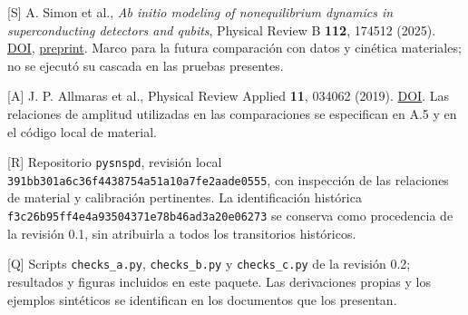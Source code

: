 \documentclass[
  spanish,
  10pt,
  a4paper,
]{article}
\newcounter{none} %
\begin{document}
{[}S{]} A. Simon et al., \emph{Ab initio modeling of nonequilibrium
dynamics in superconducting detectors and qubits}, Physical Review B
\textbf{112}, 174512 (2025).
\href{https://doi.org/10.1103/3m2k-mzr6}{DOI},
\href{https://arxiv.org/abs/2501.13791}{preprint}. Marco para la futura
comparación con datos y cinética materiales; no se ejecutó su cascada en
las pruebas presentes.

{[}A{]} J. P. Allmaras et al., Physical Review Applied \textbf{11},
034062 (2019).
\href{https://doi.org/10.1103/PhysRevApplied.11.034062}{DOI}. Las
relaciones de amplitud utilizadas en las comparaciones se especifican en
A.5 y en el código local de material.

{[}R{]} Repositorio \nolinkurl{pysnspd}, revisión local
\nolinkurl{391bb301a6c36f4438754a51a10a7fe2aade0555}, con inspección de las
relaciones de material y calibración pertinentes. La identificación
histórica \nolinkurl{f3c26b95ff4e4a93504371e78b46ad3a20e06273} se conserva
como procedencia de la revisión 0.1, sin atribuirla a todos los
transitorios históricos.

{[}Q{]} Scripts \nolinkurl{checks_a.py}, \nolinkurl{checks_b.py} y
\nolinkurl{checks_c.py} de la revisión 0.2; resultados y figuras incluidos
en este paquete. Las derivaciones propias y los ejemplos sintéticos se
identifican en los documentos que los presentan.
\end{document}
